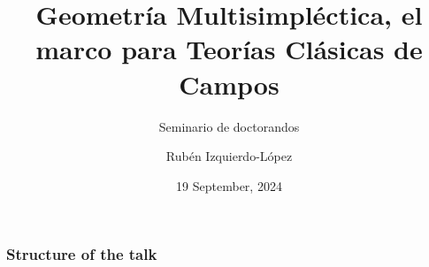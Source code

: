 \documentclass[10 pt,
handout
]{beamer}
\title{Geometría Multisimpléctica, el marco para Teorías Clásicas de Campos}
\subtitle{Seminario de doctorandos}
\author{Rubén Izquierdo-López}
\institute{ICMAT-UCM}
\date{19 September, 2024}
\theoremstyle{plain} %
\theoremstyle{definition} %
\begin{document}
    \begin{frame}[plain]
        \titlepage
    \end{frame}
    
    \begin{frame}
        \frametitle{Structure of the talk}
       \tableofcontents
    \end{frame}

    
    
    

    

    
\end{document}

